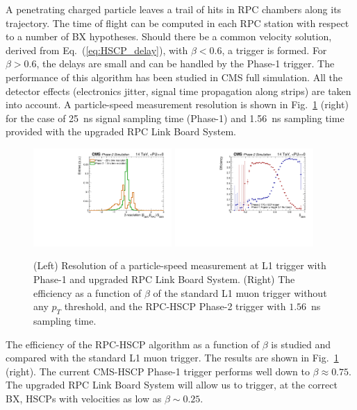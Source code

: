 A penetrating charged particle leaves a trail of hits in RPC chambers along its trajectory.
The time of flight can be computed in each RPC station with respect to a number of BX hypotheses.
Should there be a common velocity solution, derived from Eq.~(\ref{eq:HSCP_delay}), 
with $\beta < 0.6$, a trigger is formed.
For $\beta >0.6$, the delays are small and can be handled by the Phase-1 trigger.  
The performance of this algorithm has been studied in CMS full simulation. All the detector effects 
(electronics jitter, signal time propagation along strips) are taken into account. 
A particle-speed measurement resolution is shown in Fig.~\ref{fig:HCP_Trigger} (right) for the case of 25~ns
signal sampling time (Phase-1) and 1.56~ns sampling time provided with the upgraded RPC Link Board System.

\begin{figure}[t]
\begin{center}
  \includegraphics[width=0.47\textwidth]{figures/HSCP/beta_GenRes_2.pdf} \hfill
  \includegraphics[width=0.47\textwidth]{figures/HSCP/trigEff-Mu-HSCPTriggers.pdf}
  \caption{
(Left) Resolution of a particle-speed measurement at L1 trigger with Phase-1 and upgraded RPC Link Board System. 
(Right) The efficiency as a function of $\beta$ of the standard L1 muon trigger without any $p_T$ threshold, 
  and the RPC-HSCP Phase-2 trigger with $1.56$~ns sampling time.
}
  \label{fig:HCP_Trigger}
\end{center}
\end{figure}

The efficiency of the RPC-HSCP algorithm as a function of $\beta$ is studied and compared with the
standard L1 muon trigger. The results are shown in Fig.~\ref{fig:HCP_Trigger} (right).
The current CMS-HSCP Phase-1 trigger performs well down to $\beta \approx 0.75$. 
The upgraded RPC Link Board System will allow us to trigger, at the
correct BX, HSCPs with velocities as low as $\beta \sim 0.25$.


